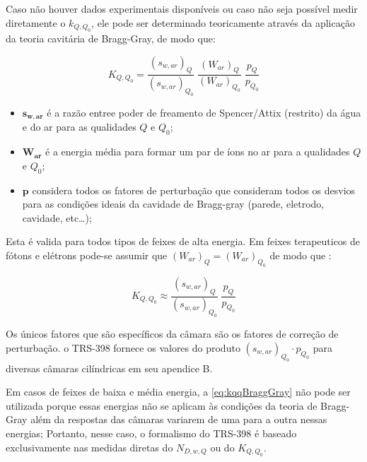 \documentclass[11pt,a4paper]{article}
\newcounter{exemplo}
\begin{document}
		Caso não houver dados experimentais disponíveis ou caso não seja possível medir diretamente o $k_{Q,Q_0}$, ele pode ser determinado teoricamente através da aplicação da teoria cavitária de Bragg-Gray, de modo que:

			\begin{equation}
				K_{Q,Q_0} = \frac{(s_{w,ar})_Q}{(s_{w,ar})_{Q_0}} \; \frac{(W_{ar})_{Q}}{(W_{ar})_{Q_0}} \; \frac{p_{Q}}{p_{Q_0}}
				\label{eq:kqqBraggGray}
			\end{equation}

			\begin{exemplo}[onde:]
				\begin{itemize}[label=\textcolor{CarnationPink}{$\star$}]
					\item \textbf{\textcolor{CarnationPink}{$\mathbf{s_{w,ar}}$}} é a razão entree poder de freamento de Spencer/Attix (restrito) da água e do ar para as qualidades $Q$ e $Q_0$;
					\item  \textbf{\textcolor{CarnationPink}{$\mathbf{W_{ar}}$}} é a energia média para formar um par de íons no ar para a qualidades $Q$ e $Q_0$;
					\item \textbf{\textcolor{CarnationPink}{$\mathbf{p}$}} considera todos os fatores de perturbação que consideram todos os desvios para as condições ideais da cavidade de Bragg-gray (parede, eletrodo, cavidade, etc\dots);
				\end{itemize}
			\end{exemplo}

		Esta  é valida para todos tipos de feixes de alta energia. Em feixes terapeuticos de fótons e elétrons pode-se assumir que $(W_{ar})_{Q} = (W_{ar})_{Q_0}$ de modo que :
		
			\begin{equation}
				K_{Q,Q_0} \approx  \frac{(s_{w,ar})_Q}{(s_{w,ar})_{Q_0}} \; \frac{p_{Q}}{p_{Q_0}}
				\label{eq:kqqAproximacao}
			\end{equation}

		Os únicos fatores que são específicos da câmara são os fatores de correção de perturbação. o TRS-398 fornece os valores do produto $(s_{w,ar})_{Q_0} \cdot p_{Q_0}$ para diversas câmaras cilíndricas em seu apendice B.

		Em casos de feixes de baixa e média energia, a \ref{eq:kqqBraggGray} não pode ser utilizada porque essas energias não se aplicam às condições da teoria de Bragg-Gray além da respostas das câmaras variarem de uma para a outra nessas energias; Portanto, nesse caso, o formalismo do TRS-398 é baseado exclusivamente nas medidas diretas do $N_{D,w,Q}$ ou do $K_{Q,Q_0}$.
\end{document}
